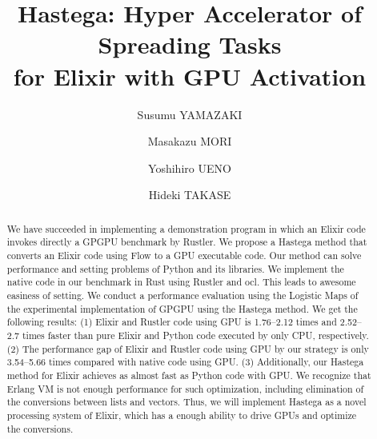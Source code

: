 \documentclass[sigplan,table]{acmart}
\begin{document}
\title{Hastega: Hyper Accelerator of Spreading Tasks \\
for Elixir with GPU Activation}

\author{Susumu YAMAZAKI}

\author{Masakazu MORI}

\author{Yoshihiro UENO}

\author{Hideki TAKASE}

\renewcommand{\shortauthors}{S. Yamazaki et al.}


\begin{abstract}
We have succeeded in implementing a demonstration program in which an Elixir code invokes directly a GPGPU benchmark by Rustler. We propose a Hastega method that converts an Elixir code using Flow to a GPU executable code. Our method can solve performance and setting problems of Python and its libraries. We implement the native code in our benchmark in Rust using Rustler and ocl. This leads to awesome easiness of setting. We conduct a performance evaluation using the Logistic Maps of the experimental implementation of GPGPU using the Hastega method. We get the following results: (1) Elixir and Rustler code using GPU is 1.76--2.12 times and 2.52--2.7 times faster than pure Elixir and Python code executed by only CPU, respectively. (2) The performance gap of Elixir and Rustler code using GPU by our strategy is only 3.54--5.66 times compared with native code using GPU. (3) Additionally, our Hastega method for Elixir achieves as almost fast as Python code with GPU. We recognize that Erlang VM is not enough performance for such optimization, including elimination of the conversions between lists and vectors. Thus, we will implement Hastega as a novel processing system of Elixir, which has a enough ability to drive GPUs and optimize the conversions.
\end{abstract}
\end{document}
